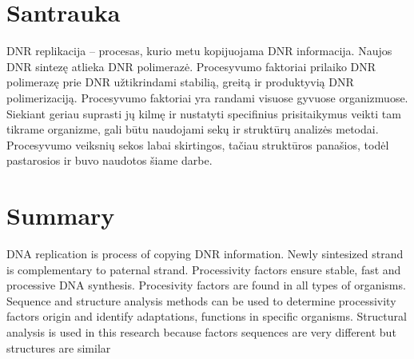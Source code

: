 \documentclass[a4paper,12pt]{article}
\begin{document}
\clearpage
  
\vspace*{1cm}  
  
\section*{Santrauka}
\qquad DNR replikacija – procesas, kurio metu kopijuojama DNR informacija. Naujos DNR sintezę atlieka DNR polimerazė. Procesyvumo faktoriai prilaiko DNR polimerazę prie DNR užtikrindami stabilią, greitą ir produktyvią DNR polimerizaciją. Procesyvumo faktoriai yra randami visuose gyvuose organizmuose. Siekiant geriau suprasti jų kilmę ir nustatyti specifinius prisitaikymus veikti tam tikrame organizme, gali būtu naudojami sekų ir struktūrų analizės metodai. Procesyvumo veiksnių sekos labai skirtingos, tačiau struktūros panašios, todėl pastarosios ir buvo naudotos šiame darbe.

\label{sec:santr}


\vspace{3cm}
  
\section*{Summary}
\qquad DNA replication is process of copying DNR information. Newly sintesized strand is complementary to paternal strand. Processivity factors ensure stable, fast and processive DNA  synthesis. Procesivity factors are found in all types of organisms.  Sequence and structure analysis methods can be used to determine processivity factors origin and identify adaptations, functions in specific organisms. Structural analysis is used in this research because factors sequences are very different but structures are similar


\label{sec:summary}



\clearpage
\end{document}
